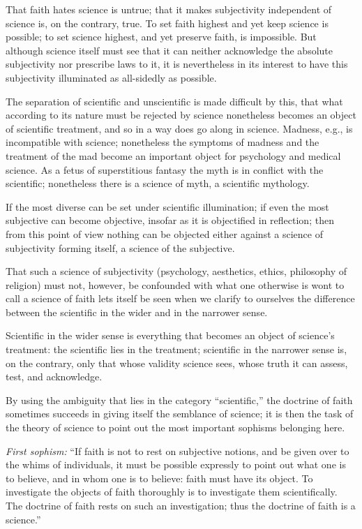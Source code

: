 \documentclass[12pt]{book}
\begin{document}
That faith hates science is untrue; that it makes subjectivity independent of science is,
on the contrary, true. To set faith highest and yet keep science is possible; to set
science highest, and yet preserve faith, is impossible.
But although science itself must see that it can neither acknowledge the absolute
subjectivity nor prescribe laws to it, it is nevertheless in its interest to have this
subjectivity illuminated as all-sidedly as possible.

The separation of scientific and unscientific is made difficult by this, that what
according to its nature must be rejected by science nonetheless becomes an object of
scientific treatment, and so in a way does go along in science. Madness, e.g., is
incompatible with science; nonetheless the symptoms of madness and the treatment of the
mad become an important object for psychology and medical science. As a fetus of
superstitious fantasy the myth is in conflict with the scientific; nonetheless there is a
science of myth, a scientific mythology.

If the most diverse can be set under scientific illumination; if even the most subjective
can become objective, insofar as it is objectified in reflection; then from this point of
view nothing can be objected either against a science of subjectivity forming itself, a
science of the subjective.

That such a science of subjectivity (psychology, aesthetics, ethics, philosophy of
religion) must not, however, be confounded with what one otherwise is wont to call a
science of faith lets itself be seen when we clarify to ourselves the difference between
the scientific in the wider and in the narrower sense.

Scientific in the wider sense is everything that becomes an object of science's treatment:
the scientific lies in the treatment; scientific in the narrower sense is, on the contrary,
only that whose validity science sees, whose truth it can assess, test, and acknowledge.

By using the ambiguity that lies in the category ``scientific,'' the doctrine of faith
sometimes succeeds in giving itself the semblance of science; it is then the task of the
theory of science to point out the most important sophisms belonging here.

\emph{First sophism:} ``If faith is not to rest on subjective notions, and be given over
to the whims of individuals,
it must be possible expressly to point out what one is to believe, and in whom one is to
believe: faith must have its object. To investigate the objects of faith thoroughly is to
investigate them scientifically. The doctrine of faith rests on such an investigation;
thus the doctrine of faith is a science.''
\end{document}
